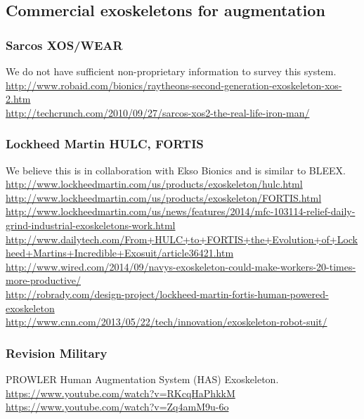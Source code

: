 
\subsection{Commercial exoskeletons for augmentation}


\subsubsection{Sarcos XOS/WEAR}

\noindent
We do not have sufficient non-proprietary information to survey
this system.\\
\url{http://www.robaid.com/bionics/raytheons-second-generation-exoskeleton-xos-2.htm}\\
\url{http://techcrunch.com/2010/09/27/sarcos-xos2-the-real-life-iron-man/}\\

\subsubsection{Lockheed Martin HULC, FORTIS}

\noindent
We believe this is in collaboration with Ekso Bionics and is similar
to BLEEX.\\
\url{http://www.lockheedmartin.com/us/products/exoskeleton/hulc.html}\\
\url{http://www.lockheedmartin.com/us/products/exoskeleton/FORTIS.html}\\
\url{http://www.lockheedmartin.com/us/news/features/2014/mfc-103114-relief-daily-grind-industrial-exoskeletons-work.html}\\
\url{http://www.dailytech.com/From+HULC+to+FORTIS+the+Evolution+of+Lockheed+Martins+Incredible+Exosuit/article36421.htm}\\
\url{http://www.wired.com/2014/09/navys-exoskeleton-could-make-workers-20-times-more-productive/}\\
\url{http://robrady.com/design-project/lockheed-martin-fortis-human-powered-exoskeleton}\\
\url{http://www.cnn.com/2013/05/22/tech/innovation/exoskeleton-robot-suit/}

\subsubsection{Revision Military}

\noindent
PROWLER Human Augmentation System (HAS) Exoskeleton.\\
\url{https://www.youtube.com/watch?v=RKcqHaPhkkM}\\
\url{https://www.youtube.com/watch?v=Zq4amM9u-6o}\\

